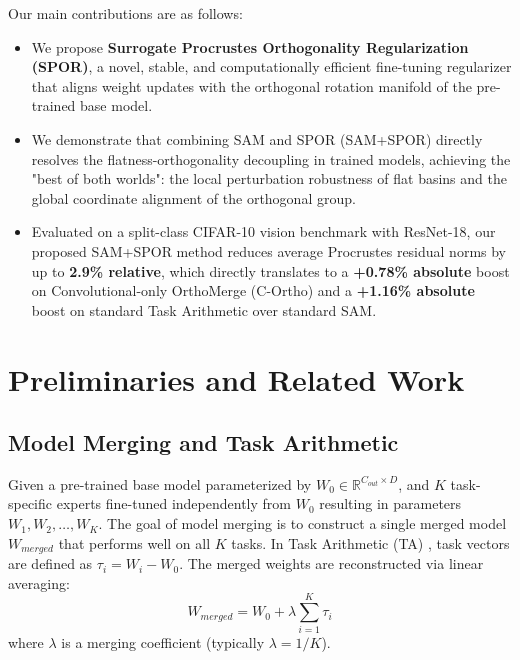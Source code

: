 \documentclass{article}
\theoremstyle{plain}
\theoremstyle{definition}
\theoremstyle{remark}
\begin{document}
Our main contributions are as follows:
\begin{itemize}
    \item We propose \textbf{Surrogate Procrustes Orthogonality Regularization (SPOR)}, a novel, stable, and computationally efficient fine-tuning regularizer that aligns weight updates with the orthogonal rotation manifold of the pre-trained base model.
    \item We demonstrate that combining SAM and SPOR (SAM+SPOR) directly resolves the flatness-orthogonality decoupling in trained models, achieving the "best of both worlds": the local perturbation robustness of flat basins and the global coordinate alignment of the orthogonal group.
    \item Evaluated on a split-class CIFAR-10 vision benchmark with ResNet-18, our proposed SAM+SPOR method reduces average Procrustes residual norms by up to \textbf{2.9\% relative}, which directly translates to a \textbf{+0.78\% absolute} boost on Convolutional-only OrthoMerge (C-Ortho) and a \textbf{+1.16\% absolute} boost on standard Task Arithmetic over standard SAM.
\end{itemize}

\section{Preliminaries and Related Work}
\label{sec:prelim}

\subsection{Model Merging and Task Arithmetic}
Given a pre-trained base model parameterized by $W_0 \in \mathbb{R}^{C_{out} \times D}$, and $K$ task-specific experts fine-tuned independently from $W_0$ resulting in parameters $W_1, W_2, \dots, W_K$. The goal of model merging is to construct a single merged model $W_{merged}$ that performs well on all $K$ tasks. 
In Task Arithmetic (TA) \cite{ilharco2022editing}, task vectors are defined as $\tau_i = W_i - W_0$. The merged weights are reconstructed via linear averaging:
\begin{equation}
    W_{merged} = W_0 + \lambda \sum_{i=1}^K \tau_i
\end{equation}
where $\lambda$ is a merging coefficient (typically $\lambda = 1/K$).
\end{document}
